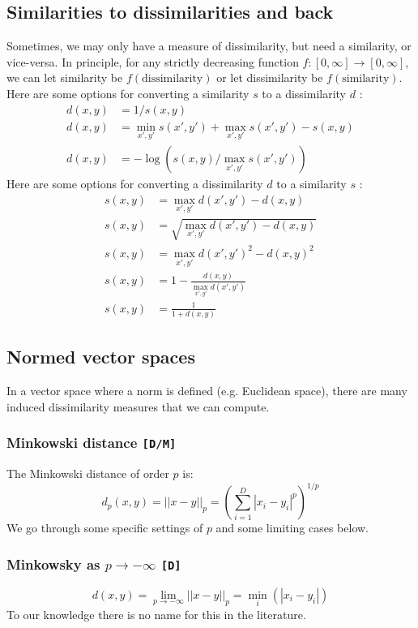 \documentclass[12pt,a4paper]{article}
\newcommand{\1}[1]{\mathds{1}\left[#1\right]}
\begin{document}
\subsection{Similarities to dissimilarities and back}
Sometimes, we may only have a measure of dissimilarity, but need a similarity, or vice-versa. In principle, for any strictly decreasing function $f:[0,\infty]\to [0,\infty]$, we can let similarity be $f(\text{dissimilarity})$ or let dissimilarity be $f(\text{similarity})$. Here are some options for converting a similarity $s$ to a dissimilarity $d$ \cite{smacof}:
\begin{align*}
    d(x,y)&=1/s(x,y)\\
    d(x,y)&=\min_{x',y'}s(x',y')+\max_{x',y'}s(x',y')-s(x,y)\\
    d(x,y)&=-\log\left(s(x,y)/\max_{x',y'}s(x',y')\right)
\end{align*}
Here are some options for converting a dissimilarity $d$ to a similarity $s$ \cite{espositosimdis}:
\begin{align*}
    s(x,y)&=\max_{x',y'}d(x',y')-d(x,y)\\
    s(x,y)&=\sqrt{\max_{x',y'}d(x',y')-d(x,y)}\\
    s(x,y)&=\max_{x',y'}d(x',y')^2-d(x,y)^2\\
    s(x,y)&=1-\frac{d(x,y)}{\max_{x',y'}d(x',y')}\\
    s(x,y)&=\frac{1}{1+d(x,y)}
\end{align*}

\subsection{Normed vector spaces}
In a vector space where a norm is defined (e.g. Euclidean space), there are many induced dissimilarity measures that we can compute.

\subsubsection{Minkowski distance \texttt{[D/M]}}
The Minkowski distance of order $p$ is:
\[d_p(x,y)=||x-y||_p=\left(\sum_{i=1}^D|x_i-y_i|^p\right)^{1/p}\]
We go through some specific settings of $p$ and some limiting cases below.
\subsubsection{Minkowsky as $p\to -\infty$ \texttt{[D]}}

\[d(x,y)=\lim_{p\to-\infty}||x-y||_p=\min_i(|x_i-y_i|)\]
To our knowledge there is no name for this in the literature.
\end{document}
